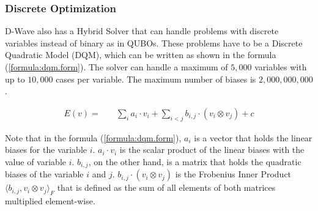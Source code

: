 \subsubsection{Discrete Optimization}

D-Wave also has a Hybrid Solver that can handle problems with discrete variables instead of binary as in QUBOs.
These problems have to be a Discrete Quadratic Model (DQM), which can be written as shown in the formula (\ref{formula:dqm.form}).
The solver can handle a maximum of $5, 000$ variables with up to $10, 000$ cases per variable.
The maximum number of biases is $2, 000, 000, 000$.
\cite{DQMHybrid2020}

\begin{align}
  \label{formula:dqm.form}
  E(v) =
  & \quad \sum_i a_i \cdot v_i + \sum_{i < j} b_{i, j} \cdot \left( v_i \otimes v_j \right) + c
\end{align}

Note that in the formula (\ref{formula:dqm.form}), $a_i$ is a vector that holds the linear biases for the variable $i$.
$a_i \cdot v_i$ is the scalar product of the linear biases with the value of variable $i$.
$b_{i, j}$, on the other hand, is a matrix that holds the quadratic biases of the variable $i$ and $j$.
$b_{i, j} \cdot \left( v_i \otimes v_j \right)$ is the Frobenius Inner Product $\langle b_{i, j}, v_i \otimes v_j \rangle_F$ that is defined as the sum of all elements of both matrices multiplied element-wise.

